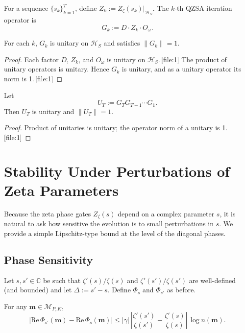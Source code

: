 \documentclass[11pt]{article}
\begin{document}
For a sequence \(\{s_k\}_{k=1}^T\), define \(Z_k := Z_\zeta(s_k)|_{\mathcal{H}_S}\). The \(k\)-th QZSA iteration operator is
\begin{equation}
    G_k := D \cdot Z_k \cdot O_\omega.
\end{equation}

\begin{proposition}
For each \(k\), \(G_k\) is unitary on \(\mathcal{H}_S\) and satisfies \(\|G_k\| = 1\).
\end{proposition}

\begin{proof}
Each factor \(D\), \(Z_k\), and \(O_\omega\) is unitary on \(\mathcal{H}_S\).\,[file:1] The product of unitary operators is unitary. Hence \(G_k\) is unitary, and as a unitary operator its norm is 1.\,[file:1]
\end{proof}

\begin{corollary}
Let
\[
U_T := G_T G_{T-1} \cdots G_1.
\]
Then \(U_T\) is unitary and \(\|U_T\| = 1\).
\end{corollary}

\begin{proof}
Product of unitaries is unitary; the operator norm of a unitary is 1.\,[file:1]
\end{proof}

\section{Stability Under Perturbations of Zeta Parameters}

Because the zeta phase gates \(Z_\zeta(s)\) depend on a complex parameter \(s\), it is natural to ask how sensitive the evolution is to small perturbations in \(s\). We provide a simple Lipschitz-type bound at the level of the diagonal phases.

\subsection{Phase Sensitivity}

Let \(s, s' \in \mathbb{C}\) be such that \(\zeta'(s)/\zeta(s)\) and \(\zeta'(s')/\zeta(s')\) are well-defined (and bounded) and let \(\Delta := s' - s\). Define \(\Phi_s\) and \(\Phi_{s'}\) as before.

\begin{lemma}
For any \(\mathbf{m} \in \mathcal{M}_{P,K}\),
\[
\left| \mathrm{Re}\,\Phi_{s'}(\mathbf{m}) - \mathrm{Re}\,\Phi_s(\mathbf{m}) \right|
\leq |\gamma|\,\left| \frac{\zeta'(s')}{\zeta(s')} - \frac{\zeta'(s)}{\zeta(s)} \right| \,\log n(\mathbf{m}).
\]
\end{lemma}
\end{document}
